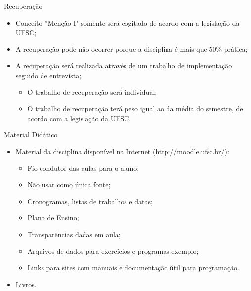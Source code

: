 \documentclass[12pt]{beamer}
\begin{document}
\begin{frame}{Recuperação}
\begin{itemize}
\item Conceito ''Menção I" somente será cogitado de acordo com a legislação da UFSC;
\item A recuperação pode não ocorrer porque a disciplina é mais que 50\% prática;
\item A recuperação será realizada através de um trabalho de implementação seguido de entrevista;
\begin{itemize}
\item O trabalho de recuperação será individual;
\item O trabalho de recuperação terá peso igual ao da média do semestre, de acordo com a legislação da UFSC.
\end{itemize}
\end{itemize}
\end{frame}

\begin{frame}{Material Didático}
\begin{itemize}
\item Material da disciplina disponível na Internet (http://moodle.ufsc.br/):
\begin{itemize}
\item Fio condutor das aulas para o aluno;
\item Não usar como única fonte;
\item Cronogramas, listas de trabalhos e datas;
\item Plano de Ensino;
\item Transparências dadas em aula;
\item Arquivos de dados para exercícios e programas-exemplo;
\item Links para sites com manuais e documentação útil para programação.
\end{itemize}
\item Livros.
\end{itemize}
\end{frame}
\end{document}
